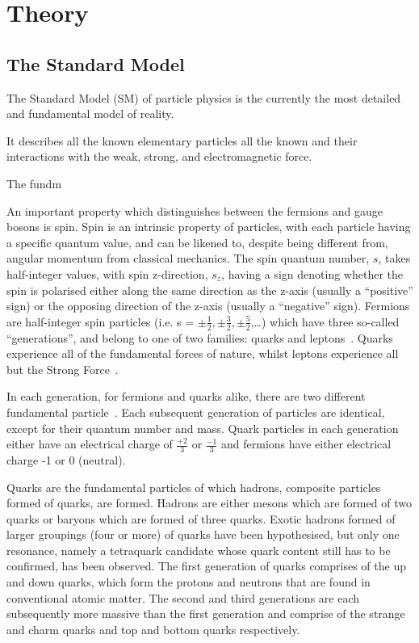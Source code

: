 \chapter{Theory}\label{chapter:theory}
\section{The Standard Model}\label{sec:sm}

The Standard Model (SM) of particle physics is the currently the most detailed and fundamental model of reality.

It describes all the known elementary particles 
all the known  and their interactions with the weak, strong, and electromagnetic force.

The fundm


An important property which distinguishes between the fermions and gauge bosons is spin. 
Spin is an intrinsic property of particles, with each particle having a specific quantum value, and can be likened to, despite being different from, angular momentum from classical mechanics\cite{QM}. 
The spin quantum number, $s$,  takes half-integer values, with spin z-direction, $s_{z}$, having a sign denoting whether the spin is polarised either along the same direction as the z-axis (usually a ``positive'' sign) or the opposing direction of the z-axis (usually a ``negative'' sign)\cite{QM}. 
Fermions are half-integer spin particles (i.e. s = $\pm\frac{1}{2}, \pm\frac{3}{2},\pm\frac{5}{2}$,…) which have three so-called ``generations'', and belong to one of two families: quarks and leptons~\cite{ElectroweakStrong}. 
Quarks experience all of the fundamental forces of nature, whilst leptons experience all but the Strong Force~\cite{LagrangiansSM}. 

In each generation, for fermions and quarks alike, there are two different fundamental particle~\cite{LagrangiansSM}. 
Each subsequent generation of particles are identical, except for their quantum number and mass. 
Quark particles in each generation either have an electrical charge of $\frac{+2}{3}$ or $\frac{-1}{3}$ and fermions have either electrical charge -1 or 0 (neutral)\cite{ElectroweakStrong}. 

Quarks are the fundamental particles of which hadrons, composite particles formed of quarks, are formed. 
Hadrons are either mesons which are formed of two quarks or baryons which are formed of three quarks. 
Exotic hadrons formed of larger groupings (four or more) of quarks have been hypothesised, but only one resonance, namely a tetraquark candidate whose quark content still has to be confirmed, has been observed\cite{PhysRevLett.112.222002}. 
The first generation of quarks comprises of the up and down quarks, which form the protons and neutrons that are found in conventional atomic matter. 
The second and third generations are each subsequently more massive than the first generation and comprise of the strange and charm quarks and top and bottom quarks respectively. 

